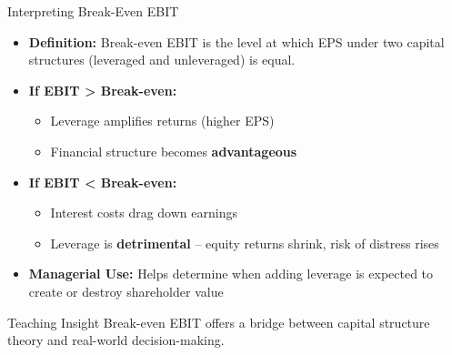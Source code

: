 \begin{frame}{Interpreting Break-Even EBIT}
	
	\begin{itemize}
		\item \textbf{Definition:}  
		Break-even EBIT is the level at which EPS under two capital structures (leveraged and unleveraged) is equal.
		
		\item \textbf{If EBIT > Break-even:}  
		\begin{itemize}
			\item Leverage amplifies returns (higher EPS)
			\item Financial structure becomes \textbf{advantageous}
		\end{itemize}
		
		\item \textbf{If EBIT < Break-even:}  
		\begin{itemize}
			\item Interest costs drag down earnings
			\item Leverage is \textbf{detrimental} -- equity returns shrink, risk of distress rises
		\end{itemize}
		
		\item \textbf{Managerial Use:}  
		Helps determine when adding leverage is expected to create or destroy shareholder value
	\end{itemize}
	
	\begin{block}{Teaching Insight}
		Break-even EBIT offers a bridge between capital structure theory and real-world decision-making.
	\end{block}
	
\end{frame}

